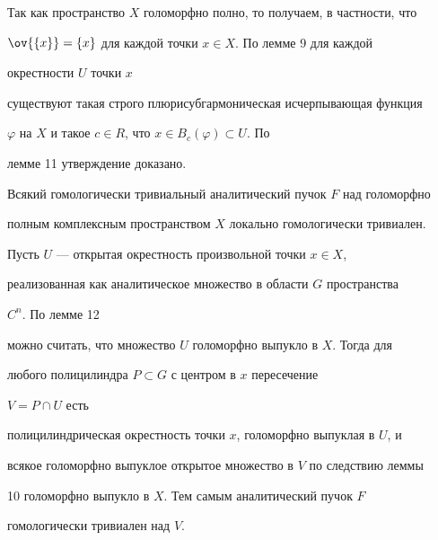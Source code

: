  


\begin{pf} 


Так как пространство $X$ голоморфно полно, то получаем, в частности, что 


$\ov{\{x\}}=\{x\}$ для каждой точки $x\in X$. По лемме 9 для каждой 


окрестности $U$ точки $x$ 


существуют такая строго плюрисубгармоническая исчерпывающая функция 


$\varphi$ на $X$ и такое $c\in R$, что $x\in B_c(\varphi)\subset U$. По 


лемме 11 утверждение доказано. 


\end{pf} 


 


\begin{thm} 


Всякий гомологически тривиальный аналитический пучок $F$ над голоморфно 


полным комплексным пространством $X$ локально гомологически тривиален. 


\end{thm} 


 


\begin{pf} 


Пусть $U$ --- открытая окрестность произвольной точки $x\in X$, 


реализованная как аналитическое множество в области $G$ пространства 


$C^n$. По лемме 12 


можно считать, что множество $U$ голоморфно выпукло в $X$. Тогда для 


любого полицилиндра $P\subset G$ с центром в $x$ пересечение 


$V=P\cap{}U$ есть 


полицилиндрическая окрестность точки $x$, голоморфно выпуклая в $U$, и 


всякое голоморфно выпуклое открытое множество в $V$ по следствию леммы 


10 голоморфно выпукло в $X$. Тем самым аналитический пучок $F$ 


гомологически тривиален над $V$. 


\end{pf} 


